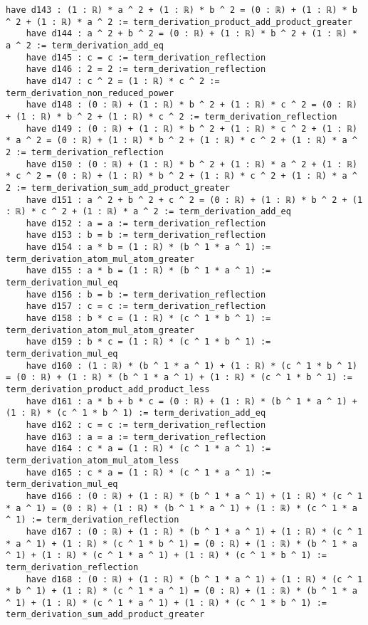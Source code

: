 \documentclass{article}
\begin{document}
\begin{tcolorbox}[colback=white!10, width=\linewidth]
\begin{lstlisting}[language=Lean4]
    have d143 : (1 : ℝ) * a ^ 2 + (1 : ℝ) * b ^ 2 = (0 : ℝ) + (1 : ℝ) * b ^ 2 + (1 : ℝ) * a ^ 2 := term_derivation_product_add_product_greater
    have d144 : a ^ 2 + b ^ 2 = (0 : ℝ) + (1 : ℝ) * b ^ 2 + (1 : ℝ) * a ^ 2 := term_derivation_add_eq
    have d145 : c = c := term_derivation_reflection
    have d146 : 2 = 2 := term_derivation_reflection
    have d147 : c ^ 2 = (1 : ℝ) * c ^ 2 := term_derivation_non_reduced_power
    have d148 : (0 : ℝ) + (1 : ℝ) * b ^ 2 + (1 : ℝ) * c ^ 2 = (0 : ℝ) + (1 : ℝ) * b ^ 2 + (1 : ℝ) * c ^ 2 := term_derivation_reflection
    have d149 : (0 : ℝ) + (1 : ℝ) * b ^ 2 + (1 : ℝ) * c ^ 2 + (1 : ℝ) * a ^ 2 = (0 : ℝ) + (1 : ℝ) * b ^ 2 + (1 : ℝ) * c ^ 2 + (1 : ℝ) * a ^ 2 := term_derivation_reflection
    have d150 : (0 : ℝ) + (1 : ℝ) * b ^ 2 + (1 : ℝ) * a ^ 2 + (1 : ℝ) * c ^ 2 = (0 : ℝ) + (1 : ℝ) * b ^ 2 + (1 : ℝ) * c ^ 2 + (1 : ℝ) * a ^ 2 := term_derivation_sum_add_product_greater
    have d151 : a ^ 2 + b ^ 2 + c ^ 2 = (0 : ℝ) + (1 : ℝ) * b ^ 2 + (1 : ℝ) * c ^ 2 + (1 : ℝ) * a ^ 2 := term_derivation_add_eq
    have d152 : a = a := term_derivation_reflection
    have d153 : b = b := term_derivation_reflection
    have d154 : a * b = (1 : ℝ) * (b ^ 1 * a ^ 1) := term_derivation_atom_mul_atom_greater
    have d155 : a * b = (1 : ℝ) * (b ^ 1 * a ^ 1) := term_derivation_mul_eq
    have d156 : b = b := term_derivation_reflection
    have d157 : c = c := term_derivation_reflection
    have d158 : b * c = (1 : ℝ) * (c ^ 1 * b ^ 1) := term_derivation_atom_mul_atom_greater
    have d159 : b * c = (1 : ℝ) * (c ^ 1 * b ^ 1) := term_derivation_mul_eq
    have d160 : (1 : ℝ) * (b ^ 1 * a ^ 1) + (1 : ℝ) * (c ^ 1 * b ^ 1) = (0 : ℝ) + (1 : ℝ) * (b ^ 1 * a ^ 1) + (1 : ℝ) * (c ^ 1 * b ^ 1) := term_derivation_product_add_product_less
    have d161 : a * b + b * c = (0 : ℝ) + (1 : ℝ) * (b ^ 1 * a ^ 1) + (1 : ℝ) * (c ^ 1 * b ^ 1) := term_derivation_add_eq
    have d162 : c = c := term_derivation_reflection
    have d163 : a = a := term_derivation_reflection
    have d164 : c * a = (1 : ℝ) * (c ^ 1 * a ^ 1) := term_derivation_atom_mul_atom_less
    have d165 : c * a = (1 : ℝ) * (c ^ 1 * a ^ 1) := term_derivation_mul_eq
    have d166 : (0 : ℝ) + (1 : ℝ) * (b ^ 1 * a ^ 1) + (1 : ℝ) * (c ^ 1 * a ^ 1) = (0 : ℝ) + (1 : ℝ) * (b ^ 1 * a ^ 1) + (1 : ℝ) * (c ^ 1 * a ^ 1) := term_derivation_reflection
    have d167 : (0 : ℝ) + (1 : ℝ) * (b ^ 1 * a ^ 1) + (1 : ℝ) * (c ^ 1 * a ^ 1) + (1 : ℝ) * (c ^ 1 * b ^ 1) = (0 : ℝ) + (1 : ℝ) * (b ^ 1 * a ^ 1) + (1 : ℝ) * (c ^ 1 * a ^ 1) + (1 : ℝ) * (c ^ 1 * b ^ 1) := term_derivation_reflection
    have d168 : (0 : ℝ) + (1 : ℝ) * (b ^ 1 * a ^ 1) + (1 : ℝ) * (c ^ 1 * b ^ 1) + (1 : ℝ) * (c ^ 1 * a ^ 1) = (0 : ℝ) + (1 : ℝ) * (b ^ 1 * a ^ 1) + (1 : ℝ) * (c ^ 1 * a ^ 1) + (1 : ℝ) * (c ^ 1 * b ^ 1) := term_derivation_sum_add_product_greater

\end{lstlisting}
\end{tcolorbox}
\end{document}
